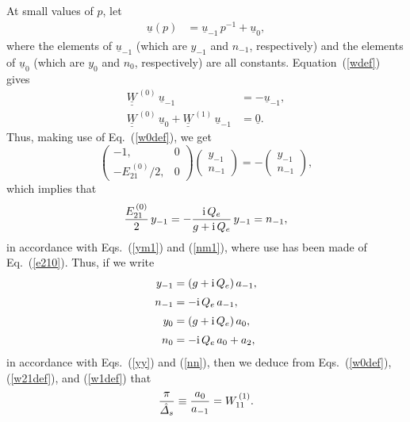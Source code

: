 \documentclass[12pt,prb,aps,notitlepage]{revtex4-1}
\begin{document}
At small values of $p$, let
\begin{align}
\underline{u}(p) &= \underline{u}_{-1}\,p^{-1} + \underline{u}_0,
\end{align}
where the elements of  $\underline{u}_{-1}$ (which are $y_{-1}$ and $n_{-1}$, respectively) and the elements of $\underline{u}_{0}$ (which are $y_0$ 
and $n_0$, respectively) are all constants.
Equation~(\ref{wdef}) gives 
\begin{align}
\underline{\underline{W}}^{\,(0)}\,\underline{u}_{-1} &= - \underline{u}_{-1},\\[0.5ex]
\underline{\underline{W}}^{\,(0)}\,\underline{u}_{0} + \underline{\underline{W}}^{\,(1)}\,\underline{u}_{-1} &=\underline{0}.\label{w1def}
\end{align}
Thus, making use of Eq.~(\ref{w0def}), we get
\begin{equation}
\left(\begin{array}{cc} -1,&0\\ -E_{21}^{\,(0)}/2,&0\end{array}\right) \left(\begin{array}{c}y_{-1}\\ n_{-1}\end{array}\right)= -\left(\begin{array}{c}y_{-1}\\ n_{-1}\end{array}\right),
\end{equation}
which implies that
\begin{equation}
\frac{E_{21}^{\,(0)}}{2}\,y_{-1}= - \frac{{\rm i}\,Q_e}{g+{\rm i}\,Q_e}\,y_{-1} = n_{-1},
\end{equation}
in accordance with Eqs.~(\ref{ym1}) and (\ref{nm1}), where use has been made of Eq.~(\ref{e210}). 
Thus, if we write
\begin{align}
y_{-1} &= (g+{\rm i}\,Q_e)\,a_{-1},\\[0.5ex]
n_{-1}&= -{\rm i}\,Q_e\,a_{-1},\\[0.5ex]
y_0 &= (g+{\rm i}\,Q_e)\,a_0,\\[0.5ex]
n_0 &= -{\rm i}\,Q_e\,a_0 + a_2,
\end{align}
in accordance with Eqs.~(\ref{yy}) and (\ref{nn}), then we deduce from Eqs.~(\ref{w0def}), (\ref{w21def}),  and (\ref{w1def}) that 
\begin{equation}
\frac{\pi}{\hat{\mit\Delta}_s}\equiv \frac{a_0}{a_{-1}} = W_{11}^{\,(1)}.
\end{equation}
\end{document}
